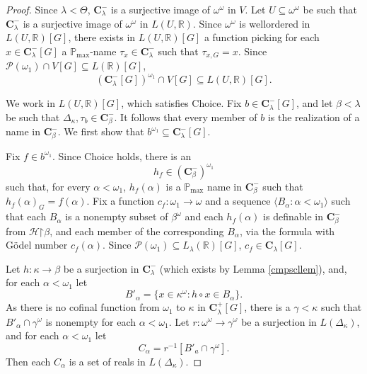 \documentclass[12pt]{article}
\def\bbC{{\mathbf{C}}}
\def\cH{{\mathcal{H}}}
\newcommand{\pmax}{\mathbb{P}_{\mathrm{max}}}
\newcommand{\bbR}{\mathbb{R}}
\newcommand{\breals}{\omega^{\omega}}
\newcommand{\cP}{\mathcal{P}}
\newcommand{\cof}{\mathrm{cof}}
\newcommand{\restrict}{\mathord{\upharpoonright}}
\begin{document}
\begin{proof}
Since $\lambda < \Theta$, $\bbC^{-}_{\lambda}$ is a surjective image of $\breals$ in $V$.
Let $U \subseteq \breals$ be such that $\bbC^{-}_{\lambda}$ is a surjective image of $\breals$ in $L(U, \bbR)$.
Since $\breals$ is wellordered in $L(U, \bbR)[G]$, there exists in $L(U, \bbR)[G]$ a function picking for each
$x \in \bbC^{-}_{\lambda}[G]$ a $\pmax$-name $\tau_{x} \in \bbC^{-}_{\lambda}$ such that $\tau_{x,G} = x$.
Since $\cP(\omega_{1}) \cap V[G] \subseteq L(\bbR)[G]$, \[(\bbC^{-}_{\lambda}[G])^{\omega_{1}} \cap V[G]
\subseteq L(U, \bbR)[G].\]


We work in $L(U, \bbR)[G]$, which satisfies Choice.
Fix $b\in \bbC^-_{\lambda}[G]$, and let $\beta < \lambda$ be
such that $\Delta_{\kappa}, \tau_{b} \in \bbC^{-}_{\beta}$.
It follows that every member of $b$ is the realization of a name in $\bbC^{-}_{\beta}$.
We first show that $b^{\omega_1}\subseteq \bbC^{-}_{\lambda}[G]$.

Fix $f \in b^{\omega_{1}}$. Since Choice holds, there is an \[h_f \in (\bbC^{-}_{\beta})^{\omega_{1}}\] such that, for every $\alpha<\omega_1$,
$h_f(\alpha)$ is a $\pmax$ name in $\bbC^{-}_{\beta}$ such that $h_{f}(\alpha)_{G} = f(\alpha)$.
Fix  a function $c_{f} \colon \omega_{1} \to \omega$  and a sequence $\langle B_\alpha:\alpha<\omega_1\rangle$ such that each
$B_\alpha$ is a nonempty subset of $\beta^{\omega}$ and each $h_f(\alpha)$ is definable in
$\bbC^{-}_{\beta}$ from $\cH \restrict \beta$, and each member of the corresponding $B_\alpha$,
via the formula with G\"{o}del number $c_{f}(\alpha)$.
Since $\cP(\omega_{1}) \subseteq L_{\lambda}(\bbR)[G]$, $c_{f} \in \bbC_{\lambda}[G]$.

Let $h \colon \kappa \to \beta$ be a surjection in $\bbC^{-}_\lambda$ (which exists by Lemma \ref{cmpscllem}), and, for each $\alpha < \omega_1$ let
\[B'_\alpha = \{ x \in \kappa^{\omega} : h \circ x \in B_\alpha\}.\]
As there is no cofinal function from $\omega_{1}$ to $\kappa$ in $\bbC^{+}_{\lambda}[G]$, there is a $\gamma < \kappa$ such that $B'_\alpha \cap \gamma^{\omega}$ is nonempty
 for each $\alpha < \omega_{1}$.
Let $r \colon \breals \to \gamma^{\omega}$ be a surjection in $L(\Delta_{\kappa})$, and for each $\alpha < \omega_{1}$ let
\[C_\alpha = r^{-1}[B'_a \cap \gamma^{\omega}].\]
Then each $C_\alpha$ is a set of reals in $L(\Delta_{\kappa})$.


\end{proof}
\end{document}
